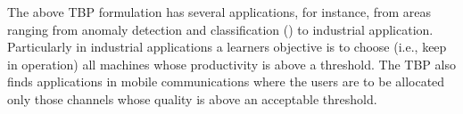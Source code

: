 The above TBP formulation has several 
applications, for instance, from areas ranging from anomaly detection and classification (\cite{locatelli2016optimal}) to industrial application. Particularly in industrial applications a learners objective is to choose (i.e., keep in  operation) all machines whose productivity is above a threshold. The TBP also finds applications in mobile communications \cite{audibert2010best}  where the users are to be allocated only those channels whose quality is above an acceptable threshold.

%
%
%
%
%